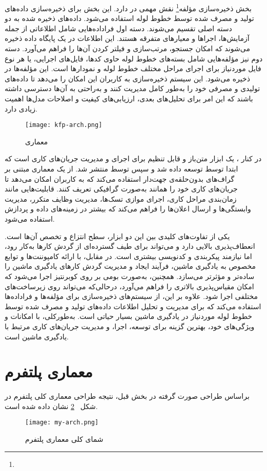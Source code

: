 بخش ذخیره‌سازی مؤلفه\footnote{} نقش مهمی در  دارد. این بخش برای ذخیره‌سازی داده‌های تولید و مصرف شده توسط خطوط لوله استفاده می‌شود. داده‌های ذخیره شده به دو دسته اصلی تقسیم می‌شوند. دسته اول فراداده‌هایی شامل اطلاعاتی از جمله آزمایش‌ها، اجراها و معیارهای متفرقه هستند. این اطلاعات در یک پایگاه داده  ذخیره می‌شوند که امکان جستجو، مرتب‌سازی و فیلتر کردن آن‌ها را فراهم می‌آورد. دسته دوم نیز مؤلفه‌هایی شامل بسته‌های خطوط لوله حاوی کدها، فایل‌های اجرایی، یا هر نوع فایل موردنیاز برای اجرای مراحل مختلف خطوط لوله و نمودارها است. این مؤلفه‌ها در  ذخیره می‌شود. این سیستم ذخیره‌سازی به کاربران این امکان را می‌دهد تا داده‌های تولیدی و مصرفی خود را به‌طور کامل مدیریت کنند و به‌راحتی به آن‌ها دسترسی داشته باشند که این امر برای تحلیل‌های بعدی، ارزیابی‌های کیفیت و اصلاحات مدل‌ها اهمیت زیادی دارد.

\begin{figure}[t]
	\centering
	\texttt{[image: kfp-arch.png]}
	\caption{معماری }
	\label{fig: kfp arch}
\end{figure}

در کنار ،  یک ابزار متن‌باز و قابل تنظیم برای اجرای و مدیریت جریان‌های کاری است که ابتدا توسط  توسعه داده شد و سپس توسط  منتشر شد.  از یک معماری مبتنی بر گراف‌های بدون‌حلقه‌ی جهت‌دار استفاده می‌کند که به کاربران امکان می‌دهد تا جریان‌های کاری خود را همانند  به‌صورت گرافیکی تعریف کنند.  قابلیت‌هایی مانند زمان‌بندی مراحل کاری، اجرای موازی تسک‌ها، مدیریت وظایف متکرر، مدیریت وابستگی‌ها و ارسال اعلان‌ها را فراهم می‌کند که بیشتر در زمینه‌های داده و پردازش  استفاده می‌شود.

یکی از تفاوت‌های کلیدی بین این دو ابزار، سطح انتزاع و تخصص آن‌ها است.  انعطاف‌پذیری بالایی دارد و می‌تواند برای طیف گسترده‌ای از گردش کارها به‌کار رود، اما نیازمند پیکربندی و کدنویسی بیشتری است. در مقابل،  با ارائه کامپوننت‌ها و توابع مخصوص به یادگیری ماشین، فرآیند ایجاد و مدیریت گردش کارهای یادگیری ماشین را ساده‌تر و مؤثرتر می‌سازد. همچنین،  به‌صورت بومی بر روی کوبرنتیز اجرا می‌شود که امکان مقیاس‌پذیری بالاتری را فراهم می‌آورد، درحالی‌که  می‌تواند روی زیرساخت‌های مختلفی اجرا شود. علاوه بر این،  از سیستم‌های ذخیره‌سازی برای مؤلفه‌ها و فراداده‌ها استفاده می‌کند که برای مدیریت و تحلیل اطلاعات داده‌های تولید و مصرف شده توسط خطوط لوله موردنیاز در یادگیری ماشین بسیار حیاتی است. به‌طورکلی،  با امکانات و ویژگی‌های خود، بهترین گزینه برای توسعه، اجرا، و مدیریت جریان‌های کاری مرتبط با یادگیری ماشین است.
\clearpage
\section{معماری پلتفرم}
براساس طراحی صورت گرفته در بخش قبل،‌ نتیجه طراحی معماری کلی پلتفرم  در شکل ~\ref{fig: platform my arch} نشان داده شده است.

\begin{figure}[t]
	\centering
	\texttt{[image: my-arch.png]}
	\caption{شمای کلی معماری پلتفرم }
	\label{fig: platform my arch}
\end{figure}

